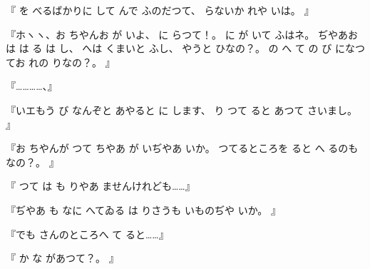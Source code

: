 『
を
べるばかりに
して
んで
ふのだつて、
らないか
れや
いは。
』

『ホヽヽ、お
ちやんお
が
いよ、
に
らつて！。
に
が
いて
ふはネ。
ぢやあお
は
は
る
は
し、
へは
くまいと
ふし、
やうと
ひなの？。
の
へ
て
の
び
になつてお
れの
りなの？。
』

『…………、』

『いエもう
び
なんぞと
あやると
に
します、
り
つて
ると
あつて
さいまし。
』

『お
ちやんが
つて
ちやあ
が
いぢやあ
いか。
つてるところを
ると
へ
るのも
なの？。
』

『
つて
は
も
りやあ
ませんけれども……』

『ぢやあ
も
なに
へてゐる
は
りさうも
いものぢや
いか。
』

『でも
さんのところへ
て
ると……』

『
か
な
があつて？。
』

